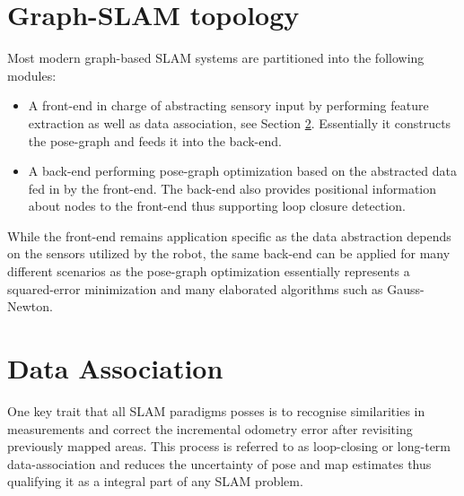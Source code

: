 \section{Graph-SLAM topology}
Most modern graph-based SLAM systems are partitioned into the following modules:
\begin{itemize}
	\item A front-end in charge of abstracting sensory input by performing feature extraction as well as data association, see Section \ref{dataAssociation}. Essentially it constructs the pose-graph and feeds it into the back-end.
	\item A back-end performing pose-graph optimization based on the abstracted data fed in by the front-end. The back-end also provides positional information about nodes to the front-end thus supporting loop closure detection. 
\end{itemize}

While the front-end remains application specific as the data abstraction depends on the sensors utilized by the robot, the same back-end can be applied for many different scenarios as the pose-graph optimization essentially represents a squared-error minimization and many elaborated algorithms such as Gauss-Newton.


\section{Data Association}\label{dataAssociation}
One key trait that all SLAM paradigms posses is to recognise similarities in measurements and correct the incremental odometry error after revisiting previously mapped areas. This process is referred to as loop-closing or long-term data-association and reduces the uncertainty of pose and map estimates thus qualifying it as a integral part of any SLAM problem. 

